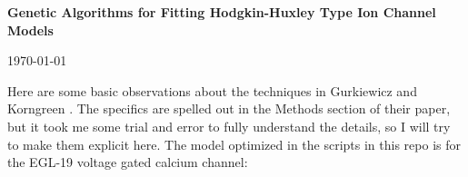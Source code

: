 \documentclass[11pt]{article}
\begin{document}
\thispagestyle{empty}

\begin{center}
{\LARGE \bf Genetic Algorithms for Fitting Hodgkin-Huxley Type Ion Channel Models}\\
\vspace{5pt}
\end{center}
\begin{center}
\vspace{-10pt}
\today
\end{center}

Here are some basic observations about the techniques in Gurkiewicz and Korngreen \cite{gurkiewicz2007numerical}.  The specifics are spelled out in the Methods section of their paper, but it took me some trial and error to fully understand the details, so I will try to make them explicit here.  The model optimized in the scripts in this repo is for the EGL-19
voltage gated calcium channel:
\end{document}
